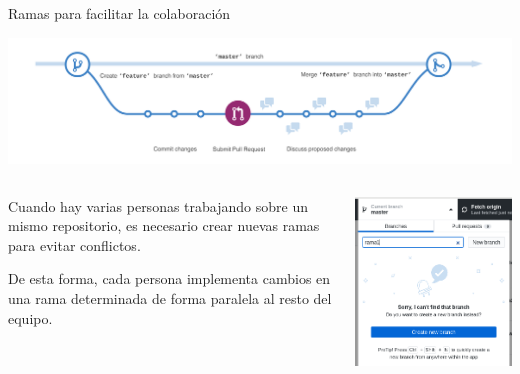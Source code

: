 \documentclass[xcolor={usenames,svgnames,dvipsnames}]{beamer}
\begin{document}
\begin{frame}[label={sec:org4af39c2}]{Ramas para facilitar la colaboración}
\begin{center}
\includegraphics[width=.9\linewidth]{figs/branching.png}
\end{center}

\begin{columns}
\begin{column}{0.6\columnwidth}
Cuando hay varias personas trabajando sobre un mismo repositorio, es necesario crear nuevas ramas para evitar conflictos. 

De esta forma, cada persona implementa \alert{cambios} en una \alert{rama determinada} de forma paralela al resto del equipo.
\end{column}

\begin{column}{0.4\columnwidth}
\begin{center}
\includegraphics[width=.9\linewidth]{figs/nueva_rama_desktop.png}
\end{center}
\end{column}
\end{columns}
\end{frame}
\end{document}
